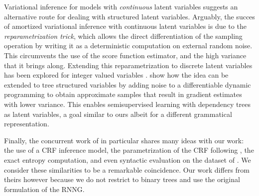   Variational inference for models with \textit{continuous} latent variables suggests an alternative route for dealing with structured latent variables. Arguably, the succes of amortized variational inference with continuous latent variables \citep{kingma2014vae,rezende2014dgm} is due to the \textit{reparametrization trick}, which allows the direct differentiation of the sampling operation by writing it as a deterministic computation on external random noise. This circumvents the use of the score function estimator, and the high variance that it brings along. Extending this reparametrization to discrete latent variables has been explored for integer valued variables \citep{jang2017gumbel,maddison2017concrete}. \citet{corro2018differentiable} show how the idea can be extended to tree structured variables by adding noise to a differentiable dynamic programming to obtain approximate samples that result in gradient estimates with lower variance. This enables semisupervised learning with dependency trees as latent variables, a goal similar to ours albeit for a different grammatical representation.

  Finally, the concurrent work of \citet{kim2019unsupervised} in particular shares many ideas with our work: the use of a CRF inference model, the parametrization of the CRF following \citet{stern2017minimal}, the exact entropy computation, and even syntactic evaluation on the dataset of \citet{linzen2018targeted}. We consider these similarities to be a remarkable coincidence. Our work differs from theirs however because we do not restrict to binary trees and use the original formulation of the RNNG.
